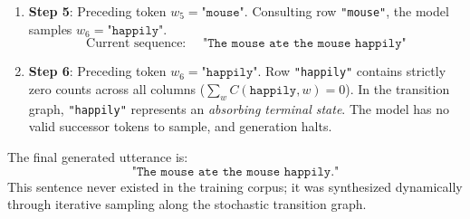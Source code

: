 \documentclass[../../main.tex]{subfiles}
\begin{document}
\begin{enumerate}
    \item \textbf{Step 5}: Preceding token $w_5 = \texttt{"mouse"}$. Consulting row \texttt{"mouse"}, the model samples $w_6 = \texttt{"happily"}$.
    \begin{equation}
    \text{Current sequence: } \quad \texttt{"The mouse ate the mouse happily"}
    \end{equation}

    \item \textbf{Step 6}: Preceding token $w_6 = \texttt{"happily"}$. Row \texttt{"happily"} contains strictly zero counts across all columns ($\sum_w C(\texttt{happily}, w) = 0$). In the transition graph, \texttt{"happily"} represents an \textit{absorbing terminal state}. The model has no valid successor tokens to sample, and generation halts.
\end{enumerate}

The final generated utterance is:
\begin{equation}
\texttt{"The mouse ate the mouse happily."}
\end{equation}
This sentence never existed in the training corpus; it was synthesized dynamically through iterative sampling along the stochastic transition graph.
\end{document}
